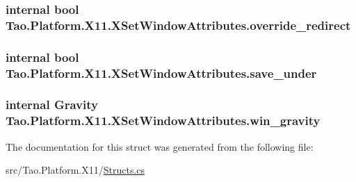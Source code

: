 \label{struct_tao_1_1_platform_1_1_x11_1_1_x_set_window_attributes_ae4d18535198ab2e7b4b5b8d2adcce479}
\hypertarget{struct_tao_1_1_platform_1_1_x11_1_1_x_set_window_attributes_adbe1a612324ad7c7cf6dfb668b582094}{
\subsubsection[{override\_\-redirect}]{\setlength{\rightskip}{0pt plus 5cm}internal bool {\bf Tao.Platform.X11.XSetWindowAttributes.override\_\-redirect}}}
\label{struct_tao_1_1_platform_1_1_x11_1_1_x_set_window_attributes_adbe1a612324ad7c7cf6dfb668b582094}
\hypertarget{struct_tao_1_1_platform_1_1_x11_1_1_x_set_window_attributes_a9d8452c295e04658ee6a00c675f1c431}{
\subsubsection[{save\_\-under}]{\setlength{\rightskip}{0pt plus 5cm}internal bool {\bf Tao.Platform.X11.XSetWindowAttributes.save\_\-under}}}
\label{struct_tao_1_1_platform_1_1_x11_1_1_x_set_window_attributes_a9d8452c295e04658ee6a00c675f1c431}
\hypertarget{struct_tao_1_1_platform_1_1_x11_1_1_x_set_window_attributes_a5d0b214a0ec149586021e711c57ab906}{
\subsubsection[{win\_\-gravity}]{\setlength{\rightskip}{0pt plus 5cm}internal {\bf Gravity} {\bf Tao.Platform.X11.XSetWindowAttributes.win\_\-gravity}}}
\label{struct_tao_1_1_platform_1_1_x11_1_1_x_set_window_attributes_a5d0b214a0ec149586021e711c57ab906}


The documentation for this struct was generated from the following file:\begin{DoxyCompactItemize}
\item 
src/Tao.Platform.X11/\hyperlink{_structs_8cs}{Structs.cs}\end{DoxyCompactItemize}
